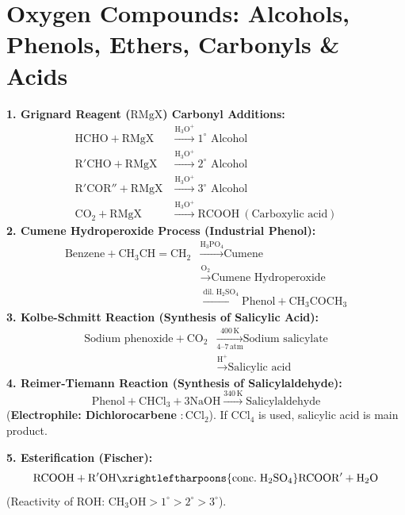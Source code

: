 \documentclass[10pt,twoside,openright]{book}
\begin{document}
\section{Oxygen Compounds: Alcohols, Phenols, Ethers, Carbonyls \& Acids}

\begin{formulabox}
\textbf{1. Grignard Reagent ($\mathrm{RMgX}$) Carbonyl Additions:}
\begin{align*}
  \mathrm{HCHO} + \mathrm{RMgX} &\xrightarrow{\mathrm{H_3O^+}} 1^\circ \text{ Alcohol} \\
  \mathrm{R'CHO} + \mathrm{RMgX} &\xrightarrow{\mathrm{H_3O^+}} 2^\circ \text{ Alcohol} \\
  \mathrm{R'COR''} + \mathrm{RMgX} &\xrightarrow{\mathrm{H_3O^+}} 3^\circ \text{ Alcohol} \\
  \mathrm{CO_2} + \mathrm{RMgX} &\xrightarrow{\mathrm{H_3O^+}} \mathrm{RCOOH} \ (\text{Carboxylic acid})
\end{align*}
\textbf{2. Cumene Hydroperoxide Process (Industrial Phenol):}
\begin{align*}
  \text{Benzene} + \mathrm{CH_3CH=CH_2} &\xrightarrow{\mathrm{H_3PO_4}} \text{Cumene} \\
  &\xrightarrow{\mathrm{O_2}} \text{Cumene Hydroperoxide} \\
  &\xrightarrow{\mathrm{dil.\; H_2SO_4}} \text{Phenol} + \mathrm{CH_3COCH_3}
\end{align*}
\textbf{3. Kolbe-Schmitt Reaction (Synthesis of Salicylic Acid):}
\begin{align*}
  \text{Sodium phenoxide} + \mathrm{CO_2} &\xrightarrow[4\text{--}7\,\mathrm{atm}]{400\,\mathrm{K}} \text{Sodium salicylate} \\
  &\xrightarrow{\mathrm{H}^+} \text{Salicylic acid}
\end{align*}
\textbf{4. Reimer-Tiemann Reaction (Synthesis of Salicylaldehyde):}
\begin{equation*}
  \text{Phenol} + \mathrm{CHCl_3} + 3\mathrm{NaOH} \xrightarrow{340\,\mathrm{K}} \text{Salicylaldehyde}
\end{equation*}
(\textbf{Electrophile: Dichlorocarbene } $:\mathrm{CCl}_2$). If $\mathrm{CCl}_4$ is used, salicylic acid is main product.

\textbf{5. Esterification (Fischer):}
\begin{equation*}
  \mathrm{RCOOH} + \mathrm{R'OH} \xrightleftharpoons{\mathrm{conc.\; H_2SO_4}} \mathrm{RCOOR'} + \mathrm{H_2O}
\end{equation*}
(Reactivity of ROH: $\mathrm{CH_3OH} > 1^\circ > 2^\circ > 3^\circ$).
\end{formulabox}
\end{document}
